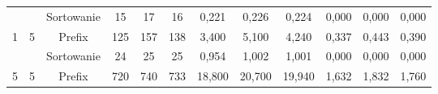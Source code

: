 \documentclass[magisterska]{pracamgr}
\begin{document}
\begin{table}[H]
{\begin{tabular}{@{}cccccccccccc@{}}
                                                                &                                                         & Sortowanie & 15                                                      & 17                                                      & 16                                                         & 0,221                                                      & 0,226                                                      & 0,224                                                          & 0,000                                                              & 0,000                                                               & 0,000                                                                 \\
1                                                               & 5                                                       & Prefix     & 125                                                     & 157                                                     & 138                                                        & 3,400                                                      & 5,100                                                      & 4,240                                                          & 0,337                                                              & 0,443                                                               & 0,390                                                                 \\ \midrule
                                                                &                                                         & Sortowanie & 24                                                      & 25                                                      & 25                                                         & 0,954                                                      & 1,002                                                      & 1,001                                                          & 0,000                                                              & 0,000                                                               & 0,000                                                                 \\
5                                                               & 5                                                       & Prefix     & 720                                                     & 740                                                     & 733                                                        & 18,800                                                     & 20,700                                                     & 19,940                                                         & 1,632                                                              & 1,832                                                               & 1,760                                                                 \\ \midrule

\end{tabular}}
\end{table}
\end{document}
